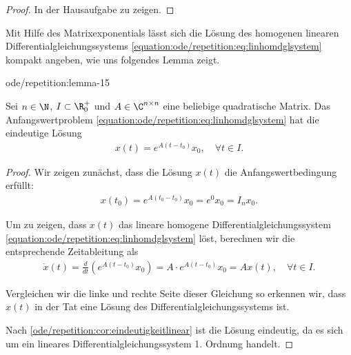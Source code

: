 \documentclass[letterpaper,10pt,german]{jupyterBook}
\begin{document}
\begin{proof}
 In der Hausaufgabe zu zeigen.
\end{proof}

\par
Mit Hilfe des Matrixexponentials lässt sich die Lösung des homogenen linearen Differentialgleichungssystems \eqref{equation:ode/repetition:eq:linhomdglsystem} kompakt angeben, wie uns folgendes Lemma zeigt.
\begin{lemma}{}{ode/repetition:lemma-15}



\par
Sei \(n\in \N\), \(I \subset \R^+_0\) und \(A \in \C^{n\times n}\) eine beliebige quadratische Matrix.
Das Anfangswertproblem \eqref{equation:ode/repetition:eq:linhomdglsystem} hat die eindeutige Lösung
\begin{align*}
x(t) = e^{A(t-t_0)}x_0, \quad \forall t \in I.
\end{align*}\end{lemma}

\begin{proof}
 Wir zeigen zunächst, dass die Lösung \(x(t)\) die Anfangswertbedingung erfüllt:
\begin{align*}
x(t_0) = e^{A(t_0-t_0)}x_0 = e^0x_0 = I_n x_0.
\end{align*}
\par
Um zu zeigen, dass \(x(t)\) das lineare homogene Differentialgleichungssystem \eqref{equation:ode/repetition:eq:linhomdglsystem} löst, berechnen wir die entsprechende Zeitableitung als
\begin{align*}
\dot{x}(t) = \frac{d}{dt}(e^{A(t-t_0)}x_0) = A \cdot e^{A(t-t_0)}x_0 = A x(t), \quad \forall t \in I.
\end{align*}
\par
Vergleichen wir die linke und rechte Seite dieser Gleichung so erkennen wir, dass \(x(t)\) in der Tat eine Lösung des Differentialgleichungssystems ist.

\par
Nach \cref{ode/repetition:cor:eindeutigkeitlinear} ist die Lösung eindeutig, da es sich um ein lineares Differentialgleichungssystem 1. Ordnung handelt.
\end{proof}
\end{document}
